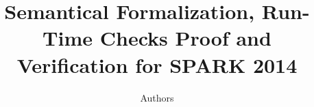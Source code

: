 \documentclass{llncs}
\begin{document}
\title{Semantical Formalization, Run-Time Checks Proof and
Verification for SPARK 2014}


\author{Authors}

    
\maketitle













% 
% 
\end{document}
